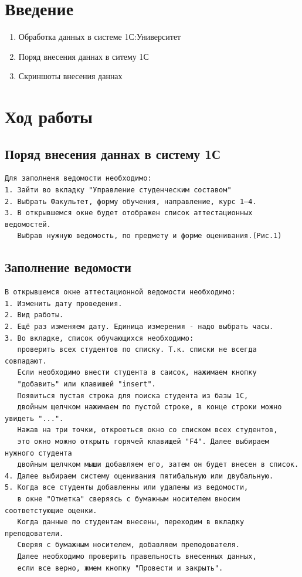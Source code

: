 \documentclass[12pt,a4paper]{scrartcl}
\begin{document}
\section{Введение}
\label{sec:intro}

\begin{enumerate}
 \item Обработка данных в системе 1С:Университет
 \item Поряд внесения даннах в ситему 1С
 \item Скриншоты внесения даннах
\end{enumerate}
\section{Ход работы}
\label{sec:exp}
\subsection{Поряд внесения даннах в систему 1С}
\begin{verbatim}
Для заполненя ведомости необходимо:
1. Зайти во вкладку "Управление студенческим составом"
2. Выбрать Факультет, форму обучения, направление, курс 1–4.
3. В открывшемся окне будет отображен список аттестационных ведомостей.
   Выбрав нужную ведомость, по предмету и форме оценивания.(Рис.1)
\end{verbatim}
\subsection {Заполнение ведомости}
\begin{verbatim}
В открывшемся окне аттестационной ведомости необходимо:
1. Изменить дату проведения.
2. Вид работы.
2. Ещё раз изменяем дату. Единица измерения - надо выбрать часы.
3. Во вкладке, список обучающихся необходимо:
   проверить всех студентов по списку. Т.к. списки не всегда совпадают.  
   Если необходимо внести студента в саисок, нажимаем кнопку 
   "добавить" или клавишей "insert".
   Появиться пустая строка для поиска студента из базы 1С,
   двойным щелчком нажимаем по пустой строке, в конце строки можно увидеть "...".
   Нажав на три точки, откроеться окно со списком всех студентов,
   это окно можно открыть горячей клавищей "F4". Далее выбираем нужного студента
   двойным щелчком мыши добавляем его, затем он будет внесен в список.
4. Далее выбираем систему оценивания пятибальную или двубальную.
5. Когда все студенты добавленны или удалены из ведомости,
   в окне "Отметка" сверяясь с бумажным носителем вносим соответстующие оценки.
   Когда данные по студентам внесены, переходим в вкладку преподователи.
   Сверяя с бумажным носителем, добавляем преподователя.
   Далее необходимо проверить правельность внесенных данных,
   если все верно, жмем кнопку "Провести и закрыть".
   
   
\end{verbatim}
\label{sec:exp:code}
\end{document}
